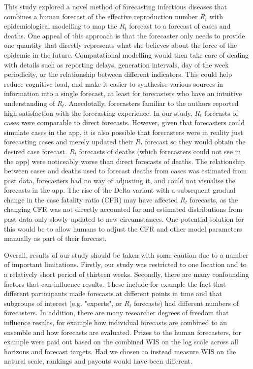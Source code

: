 \documentclass[10pt,a4paper,twocolumn]{article}
\begin{document}
This study explored a novel method of forecasting infectious diseases that combines a human forecast of the effective reproduction number $R_t$ with epidemiological modelling to map the $R_t$ forecast to a forecast of cases and deaths. One appeal of this approach is that the forecaster only needs to provide one quantity that directly represents what she believes about the force of the epidemic in the future. Computational modelling would then take care of dealing with details such as reporting delays, generation intervals, day of the week periodicity, or the relationship between different indicators. This could help reduce cognitive load, and make it easier to synthesise various sources in information into a single forecast, at least for forecasters who have an intuitive understanding of $R_t$. Anecdotally, forecasters familiar to the authors reported high satisfaction with the forecasting experience. In our study, $R_t$ forecasts of cases were comparable to direct forecasts. However, given that forecasters could simulate cases in the app, it is also possible that forecasters were in reality just forecasting cases and merely updated their $R_t$ forecast so they would obtain the desired case forecast. 
$R_t$ forecasts of deaths (which forecasters could not see in the app) were noticeably worse than direct forecasts of deaths. The relationship between cases and deaths used to forecast deaths from cases was estimated from past data, forecasters had no way of adjusting it, and could not visualise the forecasts in the app. The rise of the Delta variant with a subsequent gradual change in the case fatality ratio (CFR) may have affected $R_t$ forecasts, as the changing CFR was not directly accounted for and estimated distributions from past data only slowly updated to new circumstances. One potential solution for this would be to allow humans to adjust the CFR and other model parameters manually as part of their forecast. 


Overall, results of our study should be taken with some caution due to a number of important limitations. Firstly, our study was restricted to one location and to a relatively short period of thirteen weeks. Secondly, there are many confounding factors that can influence results. These include for example the fact that different participants made forecasts at different points in time and that subgroups of interest (e.g. "experts", or $R_t$ forecasts) had different numbers of forecasters. In addition, there are many researcher degrees of freedom that influence results, for example how individual forecasts are combined to an ensemble and how forecasts are evaluated. Prizes to the human forecasters, for example were paid out based on the combined WIS on the log scale across all horizons and forecast targets. Had we chosen to instead measure WIS on the natural scale, rankings and payouts would have been different. 
\end{document}
